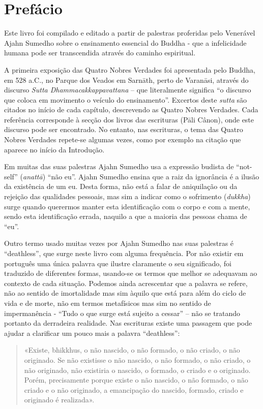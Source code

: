 \chapter{Prefácio}

Este livro foi compilado e editado a partir de palestras proferidas pelo
Venerável Ajahn Sumedho sobre o ensinamento essencial do Buddha - que a
infelicidade humana pode ser transcendida através do caminho espiritual.

A primeira exposição das Quatro Nobres Verdades foi apresentada pelo Buddha, em
528 a.C., no Parque dos Veados em Sarnāth, perto de Varanāsi, através do
discurso \emph{Sutta Dhammacakkappavattana} – que literalmente
significa “o discurso que coloca em movimento o veículo do ensinamento”.
Excertos deste \emph{sutta} são citados no início de cada capítulo, descrevendo
as Quatro Nobres Verdades. Cada referência corresponde à secção dos livros das
escrituras (Pāli Cânon), onde este discurso pode ser encontrado. No entanto, nas
escrituras, o tema das Quatro Nobres Verdades repete-se algumas vezes, como por
exemplo na citação que aparece no início da Introdução.

Em muitas das suas palestras Ajahn Sumedho usa a expressão budista de “not-self”
(\emph{anattā}) “não eu”. Ajahn Sumedho ensina que a raiz da ignorância é a
ilusão da existência de um eu. Desta forma, não está a falar de aniquilação ou
da rejeição das qualidades pessoais, mas sim a indicar como o sofrimento
(\emph{dukkha}) surge quando querermos manter esta identificação com o corpo e
com a mente, sendo esta identificação errada, naquilo a que a maioria das
pessoas chama de “eu”.

Outro termo usado muitas vezes por Ajahn Sumedho nas suas palestras é
“deathless”, que surge neste livro com alguma frequência. Por não existir em
português uma única palavra que ilustre claramente o seu significado, foi
traduzido de diferentes formas, usando-se os termos que melhor se adequavam ao
contexto de cada situação. Podemos ainda acrescentar que a palavra se refere,
não ao sentido de imortalidade mas sim àquilo que está para além do ciclo de
vida e de morte, não em termos metafísicos mas sim no sentido de impermanência -
“Tudo o que surge está sujeito a cessar” – não se tratando portanto da
derradeira realidade. Nas escrituras existe uma passagem que pode ajudar a
clarificar um pouco mais a palavra “deathless”:

\begin{quote}
  «Existe, bhikkhus, o não nascido, o não formado, o não criado, o não
  originado. Se não existisse o não nascido, o não formado, o não criado, o não
  originado, não existiria o nascido, o formado, o criado e o originado. Porém,
  precisamente porque existe o não nascido, o não formado, o não criado e o não
  originado, a emancipação do nascido, formado, criado e originado é realizada».

\end{quote}

